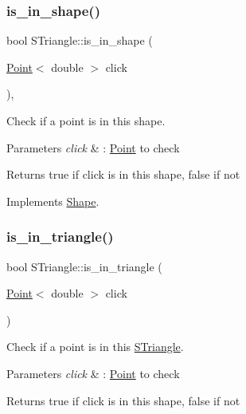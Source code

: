 \subsubsection{\texorpdfstring{is\+\_\+in\+\_\+shape()}{is\_in\_shape()}}
{\footnotesize\ttfamily bool S\+Triangle\+::is\+\_\+in\+\_\+shape (\begin{DoxyParamCaption}\item[{\hyperlink{classPoint}{Point}$<$ double $>$}]{click }\end{DoxyParamCaption})\hspace{0.3cm}{\ttfamily [override]}, {\ttfamily [virtual]}}



Check if a point is in this shape. 


\begin{DoxyParams}{Parameters}
{\em click} & \+: \hyperlink{classPoint}{Point} to check \\
\hline
\end{DoxyParams}
\begin{DoxyReturn}{Returns}
true if click is in this shape, false if not 
\end{DoxyReturn}


Implements \hyperlink{classShape_abcce23128cd35989468a88a7194152af}{Shape}.

\mbox{\label{classSTriangle_abf86e23090ebdeb01e89c32415832c78}} 
\subsubsection{\texorpdfstring{is\+\_\+in\+\_\+triangle()}{is\_in\_triangle()}}
{\footnotesize\ttfamily bool S\+Triangle\+::is\+\_\+in\+\_\+triangle (\begin{DoxyParamCaption}\item[{\hyperlink{classPoint}{Point}$<$ double $>$}]{click }\end{DoxyParamCaption})}



Check if a point is in this \hyperlink{classSTriangle}{S\+Triangle}. 


\begin{DoxyParams}{Parameters}
{\em click} & \+: \hyperlink{classPoint}{Point} to check \\
\hline
\end{DoxyParams}
\begin{DoxyReturn}{Returns}
true if click is in this shape, false if not 
\end{DoxyReturn}
\mbox{\label{classSTriangle_a9cd1c7e14501b314405745dcc296ee63}} 
